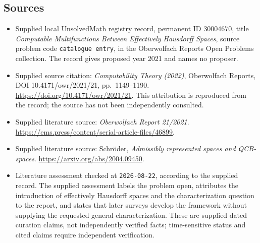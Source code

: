 \documentclass[11pt]{article}
\begin{document}
\subsection{Sources}
\begin{itemize}
\item Supplied local UnsolvedMath registry record, permanent ID \(30004670\), title \emph{Computable Multifunctions Between Effectively Hausdorff Spaces}, source problem code \texttt{catalogue entry}, in the Oberwolfach Reports Open Problems collection. The record gives proposed year 2021 and names no proposer.
\item Supplied source citation: \emph{Computability Theory (2022)}, Oberwolfach Reports, DOI 10.4171/owr/2021/21, pp.\ 1149--1190. \url{https://doi.org/10.4171/owr/2021/21}. This attribution is reproduced from the record; the source has not been independently consulted.
\item Supplied literature source: \emph{Oberwolfach Report 21/2021}. \url{https://ems.press/content/serial-article-files/46899}.
\item Supplied literature source: Schr\"oder, \emph{Admissibly represented spaces and QCB-spaces}. \url{https://arxiv.org/abs/2004.09450}.
\item Literature assessment checked at \texttt{2026-08-22}, according to the supplied record. The supplied assessment labels the problem open, attributes the introduction of effectively Hausdorff spaces and the characterization question to the report, and states that later surveys develop the framework without supplying the requested general characterization. These are supplied dated curation claims, not independently verified facts; time-sensitive status and cited claims require independent verification.
\end{itemize}
\end{document}
